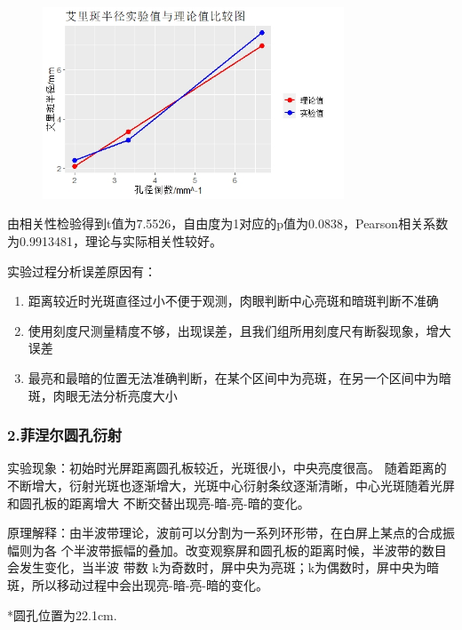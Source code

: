 \documentclass[12pt,a4paper,UTF8]{ctexart}
\begin{document}
  \begin{figure}[htbp]
	\centering
	\includegraphics[width=0.8\textwidth]{img//plot.jpeg}
	\label{fig:1}
\end{figure}

由相关性检验得到t值为7.5526，自由度为1对应的p值为0.0838，Pearson相关系数为0.9913481，理论与实际相关性较好。

实验过程分析误差原因有：
\begin{enumerate}
	\item 距离较近时光斑直径过小不便于观测，肉眼判断中心亮斑和暗斑判断不准确
	\item 使用刻度尺测量精度不够，出现误差，且我们组所用刻度尺有断裂现象，增大误差
	\item 最亮和最暗的位置无法准确判断，在某个区间中为亮斑，在另一个区间中为暗斑，肉眼无法分析亮度大小
\end{enumerate}

\subsubsection*{2.菲涅尔圆孔衍射}
实验现象：初始时光屏距离圆孔板较近，光斑很小，中央亮度很高。
随着距离的不断增大，衍射光斑也逐渐增大，光斑中心衍射条纹逐渐清晰，中心光斑随着光屏和圆孔板的距离增大
不断交替出现亮-暗-亮-暗的变化。

原理解释：由半波带理论，波前可以分割为一系列环形带，在白屏上某点的合成振幅则为各
个半波带振幅的叠加。改变观察屏和圆孔板的距离时候，半波带的数目会发生变化，当半波
带数 k为奇数时，屏中央为亮斑；k为偶数时，屏中央为暗斑，所以移动过程中会出现亮-暗-亮-暗的变化。

\begin{table}[htbp]
	\centering
	  \caption{菲涅尔衍射实验数据}
	\label{tab:3}%
  \end{table}
  *圆孔位置为22.1cm.
  
\end{document}
